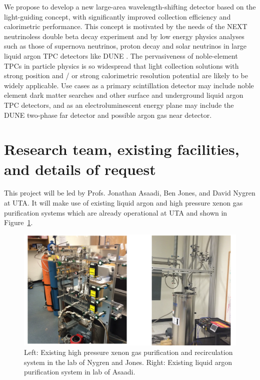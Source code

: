 We propose to develop a new large-area wavelength-shifting detector based on the light-guiding concept, with significantly improved collection efficiency and calorimetric performance.  This concept is motivated by the needs of the NEXT neutrinoless double beta decay experiment \cite{Mart} and by low energy physics analyses such as those of supernova neutrinos, proton decay and solar neutrinos in large liquid argon TPC detectors like DUNE \cite{Ankowski:2016lab,Kudryavtsev:2016ybl}. The pervasiveness of noble-element TPCs in particle physics is so widespread that light collection solutions with strong position and / or strong calorimetric resolution potential are likely to be widely applicable.  Use cases as a primary scintillation detector may include noble element dark matter searches and other surface and underground liquid argon TPC detectors, and as an electroluminescent energy plane may include the DUNE two-phase far detector and possible argon gas near detector.

\section{Research team, existing facilities, and details of request}

This project will be led by Profs. Jonathan Asaadi, Ben Jones, and David Nygren at UTA.  It will make use of existing liquid argon and high pressure xenon gas purification systems which are already operational at UTA and shown in Figure~\ref{fig:ExistingGasSystems}.  


\begin{figure}[t]
\begin{centering}
\includegraphics[width=0.90\columnwidth]{./images/PhotosOfLabs.pdf}
\par\end{centering}

\caption{Left: Existing high pressure xenon gas purification and recirculation system in the lab of Nygren and Jones.  Right: Existing liquid argon purification system in lab of Asaadi. \label{fig:ExistingGasSystems}}
\end{figure}

